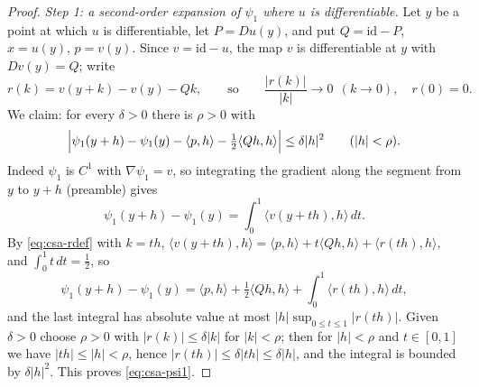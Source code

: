 \begin{proof}
\emph{Step 1: a second-order expansion of $\psi_1$ where $u$ is differentiable.}
Let $y$ be a point at which $u$ is differentiable, let $P=Du(y)$, and put
$Q=\mathrm{id}-P$, $x=u(y)$, $p=v(y)$. Since $v=\mathrm{id}-u$, the map $v$ is
differentiable at $y$ with $Dv(y)=Q$; write
\begin{equation}\label{eq:csa-rdef}
  r(k)=v(y+k)-v(y)-Qk,\qquad\text{so}\qquad \frac{|r(k)|}{|k|}\to0
  \ \ (k\to0),\quad r(0)=0.
\end{equation}
We claim: for every $\delta>0$ there is $\rho>0$ with
\begin{equation}\label{eq:csa-psi1}
  \Bigl|\psi_1(y+h)-\psi_1(y)-\langle p,h\rangle-\tfrac12\langle Qh,h\rangle\Bigr|
   \le\delta|h|^2\qquad(|h|<\rho).
\end{equation}
Indeed $\psi_1$ is $C^1$ with $\nabla\psi_1=v$, so integrating the gradient
along the segment from $y$ to $y+h$ (preamble) gives
\[
  \psi_1(y+h)-\psi_1(y)=\int_0^1\langle v(y+th),h\rangle\,dt .
\]
By \eqref{eq:csa-rdef} with $k=th$,
$\langle v(y+th),h\rangle=\langle p,h\rangle+t\langle Qh,h\rangle+\langle
r(th),h\rangle$, and $\int_0^1t\,dt=\tfrac12$, so
\[
  \psi_1(y+h)-\psi_1(y)
   =\langle p,h\rangle+\tfrac12\langle Qh,h\rangle+\int_0^1\langle r(th),h\rangle\,dt,
\]
and the last integral has absolute value at most
$|h|\sup_{0\le t\le1}|r(th)|$. Given $\delta>0$ choose $\rho>0$ with
$|r(k)|\le\delta|k|$ for $|k|<\rho$; then for $|h|<\rho$ and $t\in[0,1]$ we have
$|th|\le|h|<\rho$, hence $|r(th)|\le\delta|th|\le\delta|h|$, and the integral is
bounded by $\delta|h|^2$. This proves \eqref{eq:csa-psi1}.


\end{proof}

